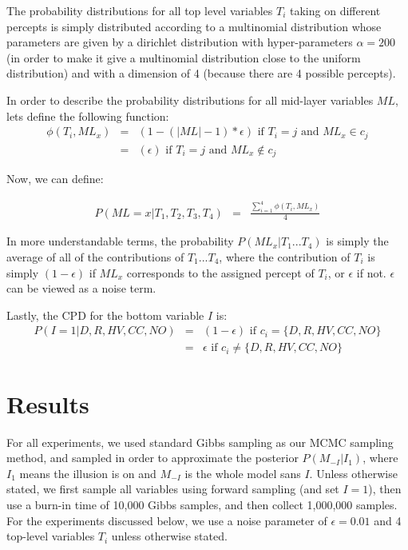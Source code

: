 \documentclass{article} %
\begin{document}
The probability distributions for all top level variables $T_i$ taking on different percepts is simply distributed according to a multinomial distribution whose parameters are given by a dirichlet distribution with hyper-parameters $\alpha = 200$ (in order to make it give a multinomial distribution close to the uniform distribution) and with a dimension of 4 (because there are 4 possible percepts).

In order to describe the probability distributions for all mid-layer variables $ML$, lets define the following function:
\begin{eqnarray*}
\phi(T_i, ML_x) &=& (1-(|ML|-1)*\epsilon) \textrm{  if } T_i = j \textrm{ and } ML_x \in c_j \\
&=& (\epsilon) \textrm{  if } T_i = j \textrm{ and } ML_x \notin c_j 
\end{eqnarray*}

Now, we can define:

\begin{eqnarray*}
P(ML = x|T_1,T_2,T_3,T_4) &=& \frac{\sum_{i=1}^4 \phi(T_i, ML_x)}{4} 
\end{eqnarray*}

In more understandable terms, the probability $P(ML_x|T_1...T_4)$ is simply the average of all of the contributions of $T_1...T_4$, where the contribution of $T_i$ is simply $(1-\epsilon)$ if $ML_x$ corresponds to the assigned percept of $T_i$, or $\epsilon$ if not. $\epsilon$ can be viewed as a noise term.

Lastly, the CPD for the bottom variable $I$ is:
\begin{eqnarray*}
P(I=1|D,R,HV,CC,NO) &=& (1-\epsilon) \textrm{   if } c_i = \{D,R,HV,CC,NO\} \\
&=& \epsilon \textrm{   if } c_i \neq \{D,R,HV,CC,NO\}  
\end{eqnarray*}


\section{Results}
For all experiments, we used standard Gibbs sampling as our MCMC sampling method, and sampled in order to approximate the posterior $P(M_{-I}|I_1)$, where $I_1$ means the illusion is on and $M_{-I}$ is the whole model sans $I$. Unless otherwise stated, we first sample all variables using forward sampling (and set $I=1$), then use a burn-in time of 10,000 Gibbs samples, and then collect 1,000,000 samples. 
For the experiments discussed below, we use a noise parameter of $\epsilon = 0.01$ and 4 top-level variables $T_i$ unless otherwise stated.  
\end{document}
